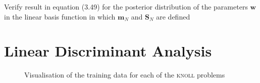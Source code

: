 \documentclass{article}
\newcommand{\vect}[1]{\ensuremath{\boldsymbol{\mathbf{#1}}}\xspace}
\begin{document}
Verify result in equation (3.49) for the posterior distribution of the
parameters \vect{w} in the linear basis function in which $\vect{m}_N$
and $\vect{S}_N$ are defined 

\section{Linear Discriminant Analysis}
\begin{figure}
  \caption{Visualisation of the training data for each of the \textsc{knoll} problems}
  \label{fig:knolldata}
\end{figure}
\end{document}
